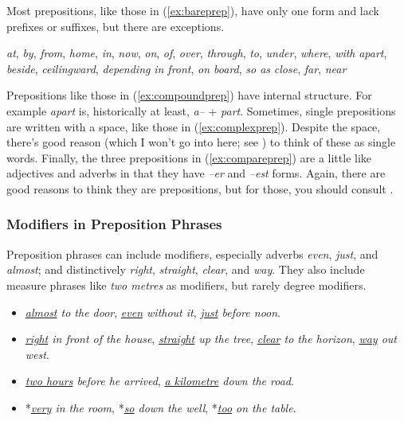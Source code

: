 Most prepositions, like those in (\ref{ex:bareprep}), have only one form and lack prefixes or suffixes, but there are exceptions.

\ea 
    \ea \textit{at}, \textit{by}, \textit{from}, \textit{home}, \textit{in}, \textit{now}, \textit{on}, \textit{of}, \textit{over}, \textit{through}, \textit{to}, \textit{under}, \textit{where}, \textit{with} \label{ex:bareprep}
    \ex \textit{apart}, \textit{beside}, \textit{ceilingward}, \textit{depending} \label{ex:compoundprep}
    \ex \textit{in front}, \textit{on board}, \textit{so as} \label{ex:complexprep}
    \ex \textit{close}, \textit{far}, \textit{near} \label{ex:compareprep}
    \z
\z

\noindent Prepositions like those in (\ref{ex:compoundprep}) have internal structure. For example \textit{apart} is, historically at least, \textit{a--} + \textit{part}. Sometimes, single prepositions are written with a space, like those in (\ref{ex:complexprep}). Despite the space, there's good reason (which I won't go into here; see \cite[622]{Huddleston2002}) to think of these as single words. Finally, the three prepositions in (\ref{ex:compareprep}) are a little like adjectives and adverbs in that they have \textit{--er} and \textit{--est} forms. Again, there are good reasons to think they are prepositions, but for those, you should consult \textcite[609]{Huddleston2002}.

\subsubsection*{Modifiers in Preposition Phrases}

Preposition phrases can include modifiers, especially adverbs \textit{even}, \textit{just}, and \textit{almost}; and distinctively \textit{right}, \textit{straight}, \textit{clear}, and \textit{way}. They also include measure phrases like \textit{two metres} as modifiers, but rarely degree modifiers.

\begin{itemize}
    \item \textit{\uline{almost} to the door}, \textit{\uline{even} without it},  \textit{\uline{just} before noon}.
    \item \textit{\uline{right} in front of the house}, \textit{\uline{straight} up the tree}, \textit{\uline{clear} to the horizon}, \textit{\uline{way} out west}.
    \item \textit{\uline{two hours} before he arrived}, \textit{\uline{a kilometre} down the road}.
    \item *\textit{\uline{very} in the room}, *\textit{\uline{so} down the well}, *\textit{\uline{too} on the table}.
\end{itemize}

